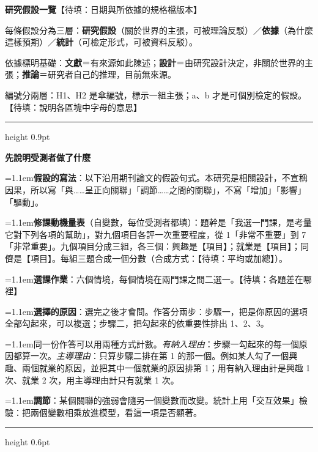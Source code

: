 \documentclass[14pt]{extarticle}
\newcommand{\nt}[1]{{\leftskip=1.1em\relax\color{sub}\small #1\par}\vspace{0.3ex}}
\begin{document}
{\LARGE\bfseries 研究假設一覽}\hfill{\color{gray}\small 【待填：日期與所依據的規格檔版本】}

\vspace{0.6ex}
{\color{gray}\small 每條假設分為三層：\textbf{研究假設}（關於世界的主張，可被理論反駁）／\textbf{依據}（為什麼這樣預期）／\textbf{統計}（可檢定形式，可被資料反駁）。\par\vspace{0.2ex}
依據標明基礎：\textbf{文獻}＝有來源如此陳述；\textbf{設計}＝由研究設計決定，非關於世界的主張；\textbf{推論}＝研究者自己的推理，目前無來源。\par\vspace{0.2ex}
編號分兩層：H1、H2 是傘編號，標示一組主張；a、b 才是可個別檢定的假設。【待填：說明各區塊中字母的意思】}

\vspace{1.0ex}
\hrule height 0.9pt
\vspace{0.4ex}

{\color{hdr}\bfseries\large 先說明受測者做了什麼}\par\vspace{0.3ex}
\nt{\textbf{假設的寫法}：以下沿用期刊論文的假設句式。本研究是相關設計，不宣稱因果，所以寫「與……呈正向關聯」「調節……之間的關聯」，不寫「增加」「影響」「驅動」。}
\nt{\textbf{修課動機量表}（自變數，每位受測者都填）：題幹是「我選一門課，是考量它對下列各項的幫助」，對九個項目各評一次重要程度，從 1「非常不重要」到 7「非常重要」。九個項目分成三組，各三個：興趣是【項目】；就業是【項目】；同儕是【項目】。每組三題合成一個分數（合成方式：【待填：平均或加總】）。}
\nt{\textbf{選課作業}：六個情境，每個情境在兩門課之間二選一。【待填：各題差在哪裡】}
\nt{\textbf{選擇的原因}：選完之後才會問。作答分兩步：步驟一，把是你原因的選項全部勾起來，可以複選；步驟二，把勾起來的依重要性排出 1、2、3。}
\nt{同一份作答可以用兩種方式計數。\emph{有納入理由}：步驟一勾起來的每一個原因都算一次。\emph{主導理由}：只算步驟二排在第 1 的那一個。例如某人勾了一個興趣、兩個就業的原因，並把其中一個就業的原因排第 1；用有納入理由計是興趣 1 次、就業 2 次，用主導理由計只有就業 1 次。}
\nt{\textbf{調節}：某個關聯的強弱會隨另一個變數而改變。統計上用「交互效果」檢驗：把兩個變數相乘放進模型，看這一項是否顯著。}

\vspace{0.6ex}
\hrule height 0.6pt
\vspace{0.3ex}
\end{document}
